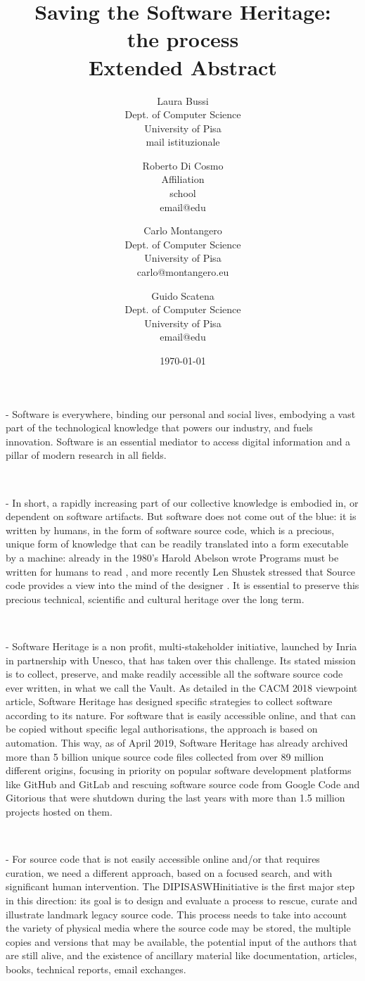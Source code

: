 \documentclass[a4paper]{article}
\title{Saving the Software Heritage:
				\\ the process  
				\\ 	\large Extended Abstract
}
\author{
    Laura Bussi\\
    Dept. of Computer Science\\
    University of Pisa\\
    mail istituzionale
	\and
    Roberto Di Cosmo\\
    Affiliation\\
    school\\
    email@edu
  \and
    Carlo Montangero\\
    Dept. of Computer Science\\
    University of Pisa\\
    carlo@montangero.eu
  \and
    Guido Scatena\\
		Dept. of Computer Science\\
    University of Pisa\\
    email@edu
}
\date{\today}
\newcommand{\DIPISASWHinitiative}{DIPISASWHinitiative }
\begin{document}
\maketitle

 - Software is everywhere,  binding our personal and social lives, embodying a vast part of the technological knowledge that powers our industry, and fuels innovation. Software is an essential mediator to access digital information and a pillar of modern research in all fields.

\

 - In short, a rapidly increasing part of our collective knowledge is embodied in, or dependent on software artifacts. But software does not come out of the blue: it is written by humans, in the form of software source code, which is a precious, unique form of knowledge that can be readily translated into a form executable by a machine: already in the 1980's Harold Abelson wrote Programs must be written for humans to read \cite{1}, and more recently Len Shustek stressed that Source code provides a view into the mind of the designer \cite{3}. It is essential to preserve this precious technical, scientific and cultural heritage over the long term.

\

 - Software Heritage is a non profit, multi-stakeholder initiative, launched by Inria in partnership with Unesco, that has taken over this challenge. Its stated mission is to collect, preserve, and make readily accessible all the software source code ever written, in what we call the Vault. As detailed in the CACM 2018 viewpoint article, Software Heritage has designed specific strategies to collect software according to its nature. For software that is easily accessible online, and that can be copied without specific legal authorisations, the approach is based on automation. This way, as of April 2019, Software Heritage has already archived more than 5 billion unique source code files collected from over 89 million different origins, focusing in priority on popular software development platforms like GitHub and GitLab and rescuing software source code from Google Code and Gitorious that were shutdown during the last years with more than 1.5 million projects hosted on them.

\

 - For source code that is not easily accessible online and/or that requires curation, we need a different approach, based on a focused search, and with significant human intervention. The \DIPISASWHinitiative is the first major step in this direction: its goal is to design and evaluate a process to rescue, curate and illustrate landmark legacy source code. This process needs to take into account the variety of physical media where the source code may be stored, the multiple copies and versions that may be available, the potential input of the authors that are still alive, and the existence of ancillary material like documentation, articles, books, technical reports, email exchanges.
\end{document}
